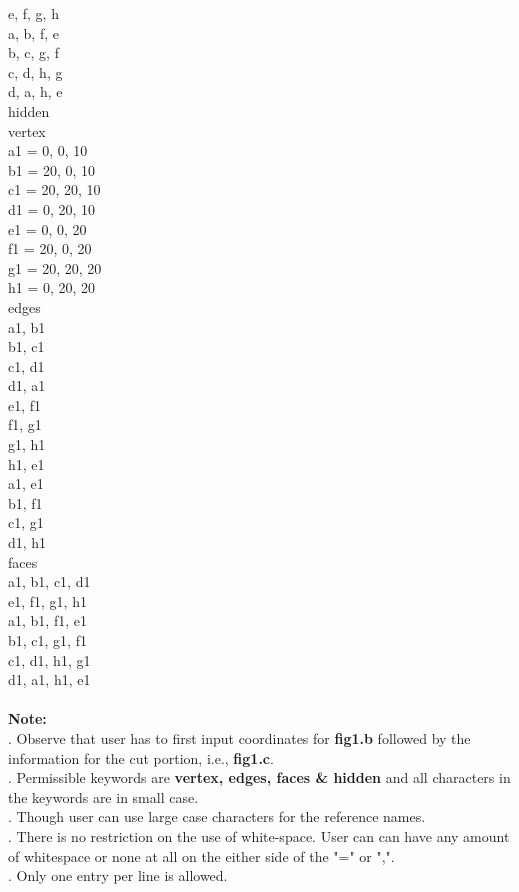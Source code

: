 e, f, g, h\\
a, b, f, e\\
b, c, g, f\\
c, d, h, g\\
d, a, h, e\\
hidden\\
vertex\\
a1 = 0, 0, 10\\
b1 = 20, 0, 10\\
c1 = 20, 20, 10\\
d1 = 0, 20, 10\\
e1 = 0, 0, 20\\
f1 = 20, 0, 20\\
g1 = 20, 20, 20\\
h1 = 0, 20, 20\\
edges\\
a1, b1\\
b1, c1\\
c1, d1\\
d1, a1\\
e1, f1\\
f1, g1\\
g1, h1\\
h1, e1\\
a1, e1\\
b1, f1\\
c1, g1\\
d1, h1\\
faces\\
a1, b1, c1, d1\\
e1, f1, g1, h1\\
a1, b1, f1, e1\\
b1, c1, g1, f1\\
c1, d1, h1, g1\\
d1, a1, h1, e1\\
\\
\textbf{Note:} \\ . Observe that user has to first input coordinates for \textbf{fig1.b} followed by the information for the cut portion, i.e., \textbf{fig1.c}.
\\ . Permissible keywords are \textbf{vertex, edges, faces \& hidden} and all characters in the keywords are in small case. \\ . Though user can use large case characters for the reference names. 
\\ . There is no restriction on the use of white-space. User can can have any amount of whitespace or none at all on the either side of the "=" or ",". 
\\ . Only one entry per line is allowed.
\\ 
